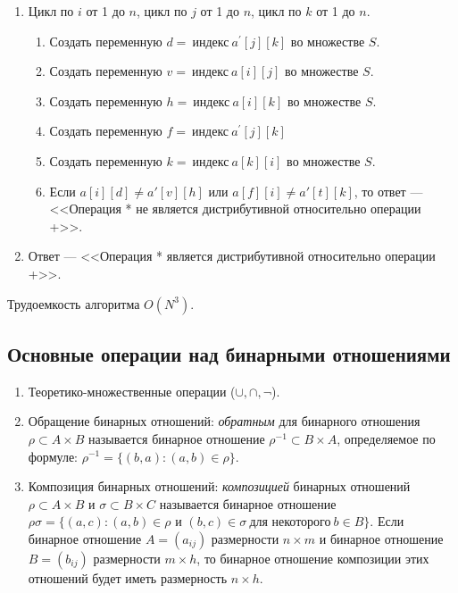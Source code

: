 \documentclass[bachelor, och, labwork]{shiza}
\begin{document}
\begin{enumerate}
    \item Цикл по $i$ от 1 до $n$, цикл по $j$ от 1 до $n$, цикл по $k$ от 1 до $n$.
        \begin{enumerate}
            \item Создать переменную $d = ~\text{индекс}~a^{'}[j][k]$ во
            множестве $S$.
            \item Создать переменную $v = ~\text{индекс}~a[i][j]$ во
            множестве $S$.
            \item Создать переменную $h = ~\text{индекс}~a[i][k]$ во
            множестве $S$.
            \item Создать переменную $f = ~\text{индекс}~a^{'}[j][k]$
            \item Создать переменную $k = ~\text{индекс}~a[k][i]$ во
            множестве $S$.
            \item Если $a[i][d] \not= a'[v][h]$ или $a[f][i] \not= a'[t][k]$, то 
            ответ --- <<Операция * не является дистрибутивной относительно операции +>>.
        \end{enumerate}
    \item Ответ --- <<Операция * является дистрибутивной относительно операции +>>.
\end{enumerate}

Трудоемкость алгоритма $O(N^3)$.

\subsection{Основные операции над бинарными отношениями}
\begin{enumerate}
    \item Теоретико-множественные операции ($\cup,\cap, \neg$).
    \item Обращение бинарных отношений: \textit{обратным} для бинарного отношения
    $\rho \subset A\times B$ называется бинарное отношение $\rho^{-1} \subset B \times A$,
    определяемое по формуле: $\rho^{-1}=\{(b,a):(a,b)\in\rho\}.$
    \item Композиция бинарных отношений: \textit{композицией} бинарных отношений
    $\rho\subset A\times B$ и $\sigma\subset B\times C$ называется бинарное
    отношение $\rho\sigma=\{(a,c):(a,b)\in\rho$ и $(b,c)\in\sigma ~\text{для некоторого}~ b \in B\}$.
    Если бинарное отношение $A=(a_{ij})$ размерности $n\times m$ и 
    бинарное отношение $B=(b_{ij})$ размерности $m\times h$, то бинарное отношение
    композиции этих отношений будет иметь размерность $n \times h$.
\end{enumerate}
\end{document}
